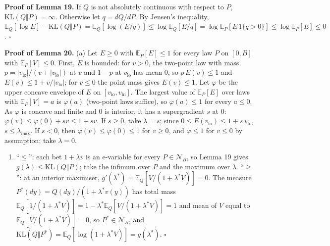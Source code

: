 \documentclass[
]{article}
\providecommand{\tightlist}{%
  \setlength{\itemsep}{0pt}\setlength{\parskip}{0pt}}
\begin{document}
\textbf{Proof of Lemma 19.} If \(Q\) is not absolutely continuous with
respect to \(P\), \(\mathrm{KL}(Q \Vert P) = \infty\). Otherwise let
\(q = dQ/dP\). By Jensen's inequality,
\(\mathbb{E}_Q[\log E] - \mathrm{KL}(Q \Vert P) = \mathbb{E}_Q[\log(E/q)] \le \log\mathbb{E}_Q[E/q] = \log\mathbb{E}_P[E\,1\lbrace q > 0\rbrace] \le \log\mathbb{E}_P[E] \le 0\).
\(\square\)

\textbf{Proof of Lemma 20.} (a) Let \(E \ge 0\) with
\(\mathbb{E}_P[E] \le 1\) for every law \(P\) on \([0, B]\) with
\(\mathbb{E}_P[V] \le 0\). First, \(E\) is bounded: for \(v > 0\), the
two-point law with mass
\(p = \lvert v_{\mathrm{lo}}\rvert/(v + \lvert v_{\mathrm{lo}}\rvert)\)
at \(v\) and \(1 - p\) at \(v_{\mathrm{lo}}\) has mean 0, so
\(p\,E(v) \le 1\) and \(E(v) \le 1 + v/\lvert v_{\mathrm{lo}}\rvert\);
for \(v \le 0\) the point mass gives \(E(v) \le 1\). Let \(\varphi\) be
the upper concave envelope of \(E\) on
\([v_{\mathrm{lo}}, v_{\mathrm{hi}}]\). The largest value of
\(\mathbb{E}_P[E]\) over laws with \(\mathbb{E}_P[V] = a\) is
\(\varphi(a)\) (two-point laws suffice), so \(\varphi(a) \le 1\) for
every \(a \le 0\). As \(\varphi\) is concave and finite and 0 is
interior, it has a supergradient \(s\) at 0:
\(\varphi(v) \le \varphi(0) + sv \le 1 + sv\). If \(s \ge 0\), take
\(\lambda = s\); since
\(0 \le E(v_{\mathrm{lo}}) \le 1 + s\,v_{\mathrm{lo}}\),
\(s \le \lambda_{\max}\). If \(s < 0\), then
\(\varphi(v) \le \varphi(0) \le 1\) for \(v \ge 0\), and
\(\varphi \le 1\) for \(v \le 0\) by assumption; take \(\lambda = 0\).

\begin{enumerate}
\def\labelenumi{(\alph{enumi})}
\setcounter{enumi}{1}
\tightlist
\item
  ``\(\le\)'': each bet \(1 + \lambda v\) is an e-variable for every
  \(P \in \mathcal{N}_B\), so Lemma 19 gives
  \(g(\lambda) \le \mathrm{KL}(Q \Vert P)\); take the infimum over \(P\)
  and the maximum over \(\lambda\). ``\(\ge\)'': at an interior
  maximiser,
  \(g'(\lambda^\ast) = \mathbb{E}_Q[V/(1 + \lambda^\ast V)] = 0\). The
  measure \(P^\ast(dy) = Q(dy)/(1 + \lambda^\ast v(y))\) has total mass
  \(\mathbb{E}_Q[1/(1 + \lambda^\ast V)] = 1 - \lambda^\ast\mathbb{E}_Q[V/(1 + \lambda^\ast V)] = 1\)
  and mean of \(V\) equal to
  \(\mathbb{E}_Q[V/(1 + \lambda^\ast V)] = 0\), so
  \(P^\ast \in \mathcal{N}_B\), and
  \(\mathrm{KL}(Q \Vert P^\ast) = \mathbb{E}_Q[\log(1 + \lambda^\ast V)] = g(\lambda^\ast)\).
  \(\square\)
\end{enumerate}
\end{document}
